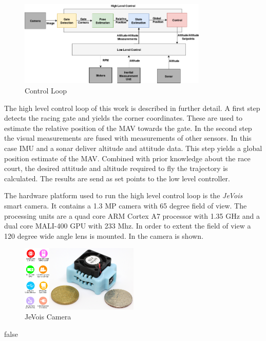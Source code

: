 \begin{figure}[hbtp]
	\centering
	\includegraphics[width=0.8\textwidth]{fig/control_loop}
	\caption{Control Loop}
	\label{fig:control_loop}
\end{figure}

The high level control loop of this work is described in further detail. A first step detects the racing gate and yields the corner coordinates. These are used to estimate the relative position of the \ac{MAV} towards the gate. In the second step the visual measurements are fused with measurements of other sensors. In this case \ac{IMU} and a sonar deliver altitude and attitude data. This step yields a global position estimate of the \ac{MAV}. Combined with prior knowledge about the race court, the desired attitude and altitude required to fly the trajectory is calculated. The results are send as set points to the low level controller.

The hardware platform used to run the high level control loop is the \textit{JeVois} smart camera. It contains a 1.3 MP camera with 65 degree field of view. The processing units are a quad core ARM Cortex A7 processor with 1.35 GHz and a dual core MALI-400 GPU with 233 Mhz. In order to extent the field of view a 120 degree wide angle lens is mounted. In  the camera is shown.

\begin{figure}[hbtp]
	\centering
	\includegraphics[width=0.5\textwidth]{fig/jevois}
	\caption{JeVois Camera}
	\label{fig:jevois}
\end{figure}



\if false
